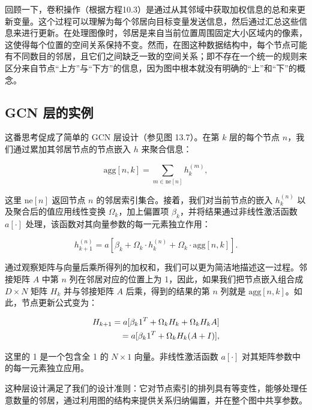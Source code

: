 \documentclass[lang=cn,newtx,10pt,scheme=chinese]{elegantbook}
\begin{document}
回顾一下，卷积操作（根据方程10.3）是通过从其邻域中获取加权信息的总和来更新变量。这个过程可以理解为每个邻居向目标变量发送信息，然后通过汇总这些信息来进行更新。在处理图像时，邻居是来自当前位置周围固定大小区域内的像素，这使得每个位置的空间关系保持不变。然而，在图这种数据结构中，每个节点可能有不同数目的邻居，且它们之间缺乏一致的空间关系；即不存在一个统一的规则来区分来自节点“上方”与“下方”的信息，因为图中根本就没有明确的“上”和“下”的概念。

\subsection{GCN 层的实例}
这番思考促成了简单的 GCN 层设计（参见图 13.7）。在第 \(k\) 层的每个节点 \(n\)，我们通过累加其邻居节点的节点嵌入 \(h\) 来聚合信息：

\begin{equation}
\text{agg}[n, k] = \sum_{m \in \text{ne}[n]} h_k^{(m)}, 
\end{equation}

这里 \(\text{ne}[n]\) 返回节点 \(n\) 的邻居索引集合。接着，我们对当前节点的嵌入 \(h_k^{(n)}\) 以及聚合后的值应用线性变换 \(\Omega_k\)，加上偏置项 \(\beta_k\)，并将结果通过非线性激活函数 \(a[\cdot]\) 处理，该函数对其向量参数的每一元素独立作用：

\begin{equation}
h_{k+1}^{(n)} = a \left[ \beta_k + \Omega_k \cdot h_k^{(n)} + \Omega_k \cdot \text{agg}[n, k] \right]. 
\end{equation}

通过观察矩阵与向量后乘所得列的加权和，我们可以更为简洁地描述这一过程。邻接矩阵 \(A\) 中第 \(n\) 列在邻居对应的位置上为 1，因此，如果我们把节点嵌入组合成 \(D \times N\) 矩阵 \(H_k\) 并与邻接矩阵 \(A\) 后乘，得到的结果的第 \(n\) 列就是 \(\text{agg}[n, k]\)。如此，节点更新公式变为：


\begin{align}
H_{k+1} = a [\beta_{k} 1^T + \Omega_k H_k + \Omega_k H_k A] \notag \\
= a [\beta_{k} 1^T + \Omega_k H_k (A + I)], 
\end{align} 


这里的 1 是一个包含全 1 的 \(N \times 1\) 向量。非线性激活函数 \(a[\cdot]\) 对其矩阵参数中的每一元素独立应用。

这种层设计满足了我们的设计准则：它对节点索引的排列具有等变性，能够处理任意数量的邻居，通过利用图的结构来提供关系归纳偏置，并在整个图中共享参数。
\end{document}
